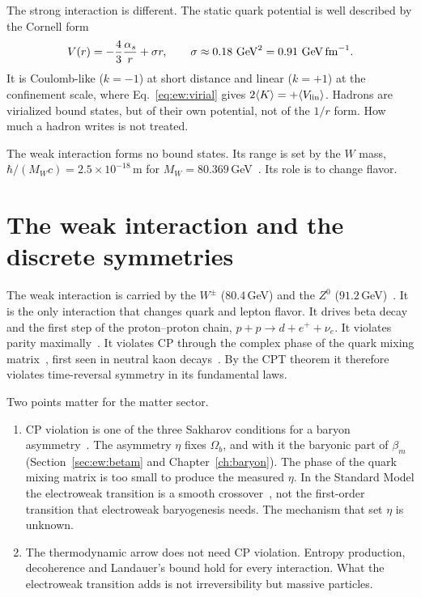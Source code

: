The strong interaction is different. The static quark potential is well described by the Cornell form~\cite{Eichten1978}
\begin{equation}
V(r)=-\frac43\frac{\alpha_s}{r}+\sigma r,\qquad\sigma\approx0.18\ {\rm GeV}^2=0.91\ {\rm GeV\,fm}^{-1}.
\end{equation}
\calc{} It is Coulomb-like ($k=-1$) at short distance and linear ($k=+1$) at the confinement scale, where Eq.~\eqref{eq:ew:virial} gives
$2\langle K\rangle=+\langle V_{\rm lin}\rangle$. Hadrons are virialized bound states, but of their own potential, not of the $1/r$ form. How much a
hadron writes is not treated. \openprob

The weak interaction forms no bound states. Its range is set by the $W$ mass, $\hbar/(M_Wc)=2.5\times10^{-18}$\,m for $M_W=80.369$\,GeV~\cite{PDG2024}.
\calc{} Its role is to change flavor.

\section{The weak interaction and the discrete symmetries}\label{sec:ew:weak}
The weak interaction is carried by the $W^\pm$ ($80.4$\,GeV) and the $Z^0$ ($91.2$\,GeV)~\cite{PDG2022}. It is the only interaction that changes quark
and lepton flavor. It drives beta decay and the first step of the proton--proton chain, $p+p\to d+e^++\nu_e$. It violates parity
maximally~\cite{Wu1957}. It violates CP through the complex phase of the quark mixing matrix~\cite{Cabibbo1963,KobayashiMaskawa1973}, first seen in
neutral kaon decays~\cite{Christenson1964}. By the CPT theorem it therefore violates time-reversal symmetry in its fundamental laws. \observed

Two points matter for the matter sector.
\begin{enumerate}
\item CP violation is one of the three Sakharov conditions for a baryon asymmetry~\cite{Sakharov1967}. The asymmetry $\eta$ fixes $\Omega_b$, and
with it the baryonic part of $\beta_m$ (Section~\ref{sec:ew:betam} and Chapter~\ref{ch:baryon}). The phase of the quark mixing matrix is too small to produce
the measured $\eta$. In the Standard Model the electroweak transition is a smooth crossover~\cite{Kajantie1996,DOnofrio2016}, not the first-order
transition that electroweak baryogenesis needs. The mechanism that set $\eta$ is unknown. \observed
\item The thermodynamic arrow does not need CP violation. Entropy production, decoherence and Landauer's bound hold for every interaction. What the
electroweak transition adds is not irreversibility but massive particles. \interp
\end{enumerate}

